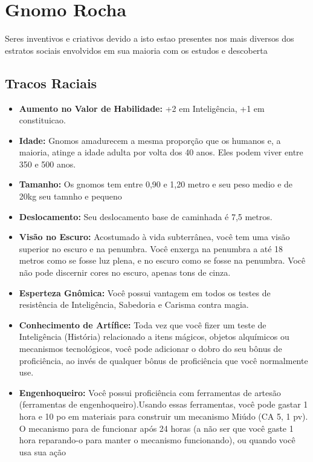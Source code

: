 \documentclass{book}
\begin{document}
\chapter{Gnomo Rocha}
Seres inventivos e criativos devido a isto estao presentes nos mais diversos dos estratos 
sociais envolvidos em sua maioria com os estudos e descoberta
\section{Tracos Raciais}
\begin{itemize}
    \item \textbf{Aumento no Valor de Habilidade:} +2 em Inteligência, +1 em constituicao.
    \item \textbf{Idade:} Gnomos amadurecem a mesma proporção que os humanos e, a 
          maioria, atinge a idade adulta por volta dos 40 anos. Eles podem viver 
          entre 350 e 500 anos.
    \item \textbf{Tamanho:} Os gnomos tem entre 0,90 e 1,20 metro e seu peso medio e de
          20kg  seu tamnho e pequeno
    \item \textbf{Deslocamento:} Seu deslocamento base de caminhada é 7,5 metros.
    \item \textbf{Visão no Escuro:} Acostumado à vida subterrânea, você tem uma visão superior 
          no escuro e na penumbra. Você enxerga na penumbra a até 18 metros como se fosse
          luz plena, e no escuro como se fosse na penumbra. Você não pode discernir cores no 
          escuro, apenas tons de cinza.
    \item \textbf{Esperteza Gnômica:} Você possui vantagem em todos os testes de resistência 
          de Inteligência, Sabedoria e Carisma contra magia.
    \item \textbf{Conhecimento de Artífice:} Toda vez que você fizer um teste de Inteligência 
          (História) relacionado a itens mágicos, objetos alquímicos ou mecanismos 
          tecnológicos, você pode adicionar o dobro do seu bônus de proficiência,
          ao invés de qualquer bônus de proficiência que você normalmente use.
    \item \textbf{Engenhoqueiro:} Você possui proficiência com ferramentas de artesão 
          (ferramentas de engenhoqueiro).Usando essas ferramentas, você pode gastar 1 
          hora e 10 po em materiais para construir um mecanismo Miúdo (CA 5, 1 pv). O
          mecanismo para de funcionar após 24 horas (a não ser que você gaste 1 hora 
          reparando-o para manter o mecanismo funcionando), ou quando você usa sua ação

\end{itemize}
\end{document}
